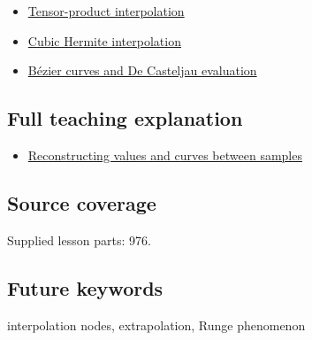 \begin{itemize}
\tightlist
\item
  \hyperref[appendix-0a09b6dfdc86]{Tensor-product interpolation}
\item
  \hyperref[appendix-db3aef8f2fd6]{Cubic Hermite interpolation}
\item
  \hyperref[appendix-ddbec701898c]{Bézier curves and De Casteljau evaluation}
\end{itemize}

\subsection{Full teaching explanation}\label{appendix-0c2a5f69851e-full-teaching-explanation}

\begin{itemize}
\tightlist
\item
  \hyperref[02-foundations-ii-ch028-reconstructing-values-and-curves-between-samples]{Reconstructing values and curves between samples}
\end{itemize}

\subsection{Source coverage}\label{appendix-0c2a5f69851e-source-coverage}

Supplied lesson parts: 976.

\subsection{Future keywords}\label{appendix-0c2a5f69851e-future-keywords}

interpolation nodes, extrapolation, Runge phenomenon
